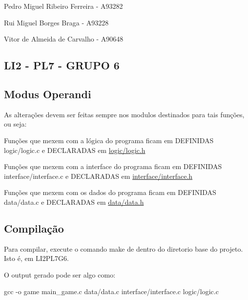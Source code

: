 Pedro Miguel Ribeiro Ferreira -\/ A93282

Rui Miguel Borges Braga -\/ A93228

Vitor de Almeida de Carvalho -\/ A90648

\subsection*{L\+I2 -\/ P\+L7 -\/ G\+R\+U\+PO 6 }

\subsection*{Modus Operandi }

As alterações devem ser feitas sempre nos modulos destinados para tais funções, ou seja\+:

Funções que mexem com a lógica do programa ficam em D\+E\+F\+I\+N\+I\+D\+AS logic/logic.\+c e D\+E\+C\+L\+A\+R\+A\+D\+AS em \hyperlink{logic_8h}{logic/logic.\+h}

Funções que mexem com a interface do programa ficam em D\+E\+F\+I\+N\+I\+D\+AS interface/interface.\+c e D\+E\+C\+L\+A\+R\+A\+D\+AS em \hyperlink{interface_8h}{interface/interface.\+h}

Funções que mexem com os dados do programa ficam em D\+E\+F\+I\+N\+I\+D\+AS data/data.\+c e D\+E\+C\+L\+A\+R\+A\+D\+AS em \hyperlink{data_8h}{data/data.\+h}

\subsection*{Compilação }

Para compilar, execute o comando \textquotesingle{}make\textquotesingle{} de dentro do diretorio base do projeto. Isto é, em L\+I2\+P\+L7\+G6.

O output gerado pode ser algo como\+: 
\begin{DoxyCode}
gcc -o game main\_game.c data/data.c interface/interface.c logic/logic.c
\end{DoxyCode}
 